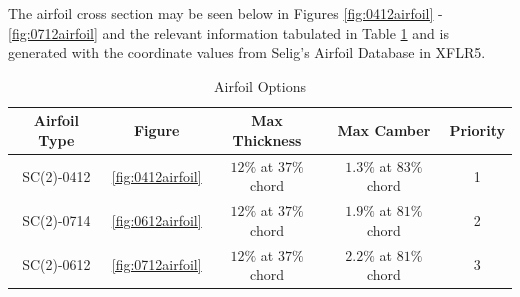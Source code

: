 The airfoil cross section may be seen below in Figures \ref{fig:0412airfoil} - \ref{fig:0712airfoil} and the relevant information tabulated in Table \ref{tab:airfoils} and is generated with the coordinate values from Selig's Airfoil Database \cite{selig} in XFLR5.

\begin{table}[!h]
    \centering
    \caption{Airfoil Options}
    \begin{tabular}{|c|c|c|c|c|} \toprule
        \textbf{Airfoil Type} & \textbf{Figure} & \textbf{Max Thickness} & \textbf{Max Camber} & \textbf{Priority}\\ \hline \hline
        SC(2)-0412 & \ref{fig:0412airfoil} & $12\%$ at $37\%$ chord & $1.3\%$ at $83\%$ chord & 1 \\ \hline
        SC(2)-0714 & \ref{fig:0612airfoil} & $12\%$ at $37\%$ chord & $1.9\%$ at $81\%$ chord & 2 \\ \hline
        SC(2)-0612 & \ref{fig:0712airfoil} & $12\%$ at $37\%$ chord & $2.2\%$ at $81\%$ chord & 3 \\ \bottomrule
    \end{tabular}
    \label{tab:airfoils}
\end{table}

